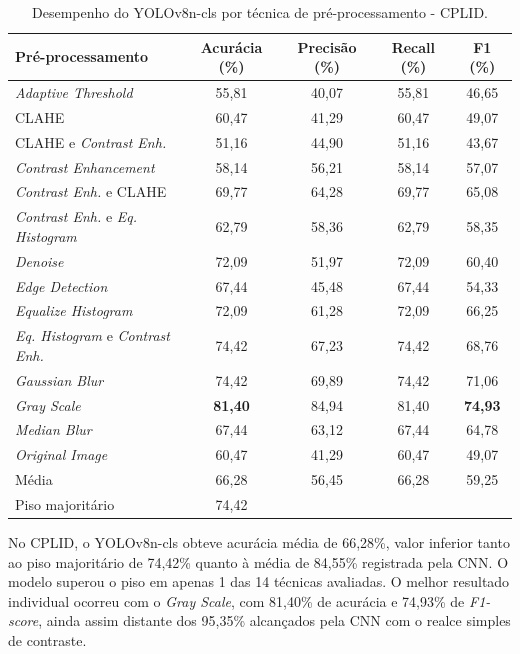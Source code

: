 \begin{table}[H]
    \centering
    \caption{\label{tab:cplid_yolocls}Desempenho do YOLOv8n-cls por técnica de pré-processamento - CPLID.}
    \vspace{0.2cm}
    \small
    \begin{tabular}{lcccc}
        \hline
        \textbf{Pré-processamento} & \textbf{Acurácia (\%)} & \textbf{Precisão (\%)} & \textbf{Recall (\%)} & \textbf{F1 (\%)} \\
        \hline
        \textit{Adaptive Threshold} & 55,81 & 40,07 & 55,81 & 46,65 \\
        CLAHE & 60,47 & 41,29 & 60,47 & 49,07 \\
        CLAHE e \textit{Contrast Enh.} & 51,16 & 44,90 & 51,16 & 43,67 \\
        \textit{Contrast Enhancement} & 58,14 & 56,21 & 58,14 & 57,07 \\
        \textit{Contrast Enh.} e CLAHE & 69,77 & 64,28 & 69,77 & 65,08 \\
        \textit{Contrast Enh.} e \textit{Eq. Histogram} & 62,79 & 58,36 & 62,79 & 58,35 \\
        \textit{Denoise} & 72,09 & 51,97 & 72,09 & 60,40 \\
        \textit{Edge Detection} & 67,44 & 45,48 & 67,44 & 54,33 \\
        \textit{Equalize Histogram} & 72,09 & 61,28 & 72,09 & 66,25 \\
        \textit{Eq. Histogram} e \textit{Contrast Enh.} & 74,42 & 67,23 & 74,42 & 68,76 \\
        \textit{Gaussian Blur} & 74,42 & 69,89 & 74,42 & 71,06 \\
        \textit{Gray Scale} & \textbf{81,40} & 84,94 & 81,40 & \textbf{74,93} \\
        \textit{Median Blur} & 67,44 & 63,12 & 67,44 & 64,78 \\
        \textit{Original Image} & 60,47 & 41,29 & 60,47 & 49,07 \\
        \hline
        Média & 66,28 & 56,45 & 66,28 & 59,25 \\
        Piso majoritário & 74,42 & & & \\
        \hline
    \end{tabular}
\end{table}

No CPLID, o YOLOv8n-cls obteve acurácia média de 66,28\%, valor inferior tanto ao piso majoritário de 74,42\% quanto à média de 84,55\% registrada pela CNN. O modelo superou o piso em apenas 1 das 14 técnicas avaliadas. O melhor resultado individual ocorreu com o \textit{Gray Scale}, com 81,40\% de acurácia e 74,93\% de \textit{F1-score}, ainda assim distante dos 95,35\% alcançados pela CNN com o realce simples de contraste.

